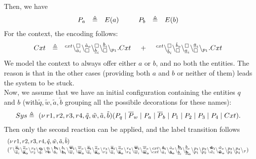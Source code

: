 Then, we have
\[
\begin{array}{lcl @{\hspace{1cm}}lcl}
P_a & \defeq & E(a) & P_b& \defeq & E(b)\\
\end{array}
\]
For the context, the encoding follows:
\[
\begin{array}{lcl @{\hspace{0.5cm}}c@{\hspace{0.5cm}} l}
Cxt &\defeq &  \startchain{cxt}\chainedlink{\hat{a}_i}{\noact}\chainedlink{\noact}{\hat{a}_o}\chainedlink{\underline{b}_i}{\noact}\chainedlink{\noact}{\underline{b}_i}\chainend{p_1}.Cxt
&+
&\startchain{cxt}\chainedlink{\hat{b}_i}{\noact}\chainedlink{\noact}{\hat{b}_o}\chainedlink{\underline{a}_i}{\noact}\chainedlink{\noact}{\underline{a}_i}\chainend{p_1}.Cxt\\
\end{array}
\]
We model the context to always offer either  $a$ or $b$, and no both the entities. The reason is that in
the other cases (providing both $a$ and $b$ or neither of them) leads the system to be stuck.\\
Now, we assume that we have an initial configuration containing the entities $q$ and $b$ (with$\tilde{q},\tilde{w},\tilde{a},\tilde{b}$ grouping all the possibile decorations for these names):
\[
\begin{array}{lcl}
Sys  \defeq \ \restrict{r1,r2,r3,r4,\tilde{q},\tilde{w},\tilde{a},\tilde{b}} (P_q \mid \overline{P}_w  \mid  P_a  \mid \overline{P}_b  \mid  P_1  \mid  P_2  \mid  P_3  \mid P_4  \mid Cxt).
\end{array}
\] 
Then only the second reaction can be applied, and the label transition follows
{\small
\[
\begin{array}{l}
(\nu\, r1,r2,r3,r4,\tilde{q},\tilde{w},\tilde{a},\tilde{b})\\
 ({}^{\tau}\backslash_{\overline{a}_i}^{\bf  \overline{a}_i}\backslash_{\bf \overline{a}_o}^{\overline{a}_o}\backslash_{r_2}^{r_2}\backslash_{q_i}^{\bf q_i}\backslash_{\bf q_i}^{q_i}\backslash_{b_i}^{\bf b_i}\backslash_{\bf b_i}^{b_i}\backslash_{\overline{w}_i}^{\bf \overline{w}_i}\backslash_{\bf \overline{w}_o}^{\overline{w}_o}\backslash_{\overline{a}_i}^{\bf \overline{a}_i}\backslash_{\bf \overline{a}_o}^{\overline{a}_o}\backslash_{r_3}^{r_3}\backslash_{\overline{a}_i}^{\bf \overline{a}_i}\backslash_{\bf \overline{a}_o}^{\overline{a}_o}\backslash_{r_4}^{r_4}\backslash_{\overline{w}_i}^{\bf \overline{w}_i}\backslash_{\bf \overline{w}_o}^{\overline{w}_o}\backslash_{cxt}^{cxt}\backslash_{\hat{a}_i}^{\bf \hat{a}_i}\backslash_{\bf \hat{a}_o}^{\hat{a}_o}\backslash_{\underline{b}_i}^{\bf \underline{b}_i}\backslash_{\bf \underline{b}_o}^{\underline{b}_o}\backslash_{p_1}^{p_1}\backslash_{p_2}^{p_2}\backslash_{\tilde{w}_i}^{\bf \tilde{w}_i}\backslash_{\bf \tilde{w}_o}^{\tilde{w}_o}\backslash_{p_3}^{p_3}\backslash_{p_4}^{p_4}\backslash_{\tau})
\end{array}
\]}
